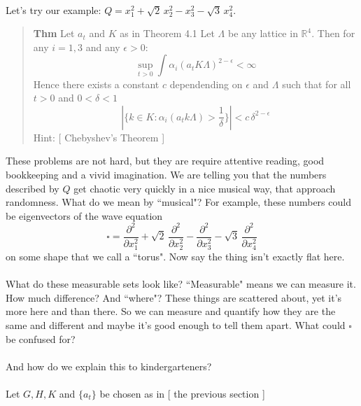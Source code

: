 \documentclass[12pt]{article}
\begin{document}
 \\
Let's try our example:  $Q = x_1^2 + \sqrt{2}\, x_2^2 - x_3^2 - \sqrt{3}\, x_4^2$. 
\begin{quotation} \noindent 
\textbf{Thm} Let $a_t$ and $K$ as in Theorem 4.1 Let $\Lambda$ be any lattice in $\mathbb{R}^4$.  Then for any $i = 1,3$ and any $\epsilon > 0$:
$$ \sup_{t > 0} \int \alpha_i(a_t K \Lambda )^{2-\epsilon} < \infty  $$
Hence there exists a constant $c$ dependending on $ \epsilon$ and $\Lambda$ such that for all $t > 0$ and $0 < \delta < 1$ 
$$ | \{ k \in K : \alpha_i(a_t k \Lambda) > \frac{1}{\delta} \}| < c \, \delta^{2-\epsilon} $$
Hint: [ Chebyshev's Theorem ]
\end{quotation}
These problems are not hard, but they are require attentive reading, good bookkeeping and a vivid imagination.  We are telling you that the numbers described by $Q$ get chaotic very quickly in a nice musical way, that approach randomness.  What do we mean by ``musical"?  For example, these numbers could be eigenvectors of the wave equation $$\square =  \frac{\partial^2}{\partial x_1^2} + \sqrt{2} \, \frac{\partial^2}{\partial x_2^2} - \frac{\partial^2}{\partial x_3^2}  - \sqrt{3} \, \frac{\partial^2}{\partial x_4^2}$$ on some shape that we call a ``torus".  Now say the thing isn't exactly flat here.  \\ \\
What do these measurable sets look like?  ``Measurable" means we can measure it.  How much difference?  And ``where"?  These things are scattered about, yet it's more here and than there.  So we can measure and quantify how they are the same and different and maybe it's good enough to tell them apart.  What could $\square$ be confused for? \\ \\
And how do we explain this to kindergarteners? \\ \\
Let $G, H, K $ and $\{ a_t\}$ be chosen as in [ the previous section ] 
\end{document}
